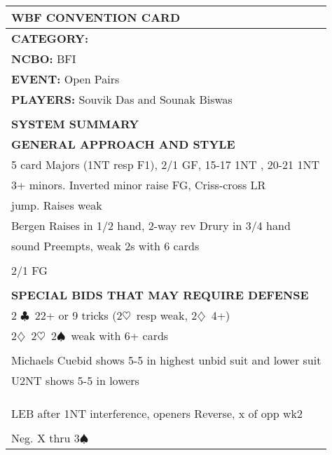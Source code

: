 \documentclass{article}
\newcommand\C{\ensuremath{\clubsuit}}
\newcommand\D{\ensuremath{\diamondsuit}}
\renewcommand\H{\ensuremath{\heartsuit}}
\renewcommand\S{\ensuremath{\spadesuit}}
\begin{document}
\begin{minipage}{90mm}
	\begin{tabular}{| p{88mm} |}
		\hline
		\cellcolor[gray]{0.9} \textbf{WBF CONVENTION CARD} \\ \hline
		\textbf{CATEGORY:} \\
		\textbf{NCBO:} BFI \\
		\textbf{EVENT:} Open Pairs \\
		\textbf{PLAYERS:} Souvik Das and Sounak Biswas \\
		\multirow{2}{*}{} \\
		\\
		\cellcolor[gray]{0.9} \textbf{SYSTEM SUMMARY} \\ \hline
		\textbf{GENERAL APPROACH AND STYLE} \\ \hline
                5 card Majors (1NT resp F1), 2/1 GF, 15-17 1NT , 20-21 1NT
                \\ \hline
                3+ minors. Inverted minor raise FG, Criss-cross LR
		\\ \hline
                jump. Raises weak
		\\ \hline
                Bergen Raises in 1/2 hand, 2-way rev Drury in 3/4 hand
		\\ \hline 
                sound Preempts, weak 2s with 6 cards 
		\\ \hline
		\\ \hline
                2/1 FG
		\\ \hline
		\\ \hline
		\textbf{SPECIAL BIDS THAT MAY REQUIRE DEFENSE} \\ \hline
                2 \C\ 22+ or 9 tricks (2\H\ resp weak, 2\D\ 4+)
		\\ \hline
                2\D\, 2\H\, 2\S\ weak with 6+ cards
		\\ \hline
		\\ \hline
                Michaels Cuebid shows 5-5 in highest unbid suit and lower suit
		\\ \hline
                U2NT shows 5-5 in lowers
		\\ \hline
		\\ \hline
		\\ \hline
		\\ \hline
                LEB after 1NT interference, openers Reverse, x of opp wk2
		\\ \hline
		\\ \hline
                Neg. X thru 3\S\
		\\ \hline

\end{tabular}
\end{minipage}
\end{document}
